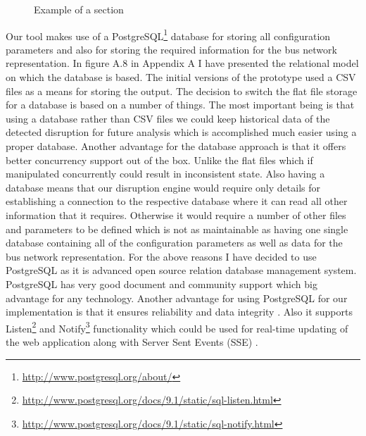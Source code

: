 \begin{figure}[ht]
	\caption{Example of a section}
	\label{fig:sectionExample}
\end{figure}

Our tool makes use of a PostgreSQL\footnote{\url{http://www.postgresql.org/about/}} database for storing all configuration parameters and also for storing the required information for the bus network representation. In figure A.8 in Appendix A I have presented the relational model on which the database is based. The initial versions of the prototype used a CSV files as a means for storing the output. The decision to switch the flat file storage for a database is based on a number of things. The most important being is that using a database rather than CSV files we could keep historical data of the detected disruption for future analysis which is accomplished much easier using a proper database. Another advantage for the database approach is that it offers better concurrency support out of the box. Unlike the flat files which if manipulated concurrently could result in inconsistent state. Also having a database means that our disruption engine would require only details for establishing a connection to the respective database where it can read all other information that it requires. Otherwise it would require a number of other files and parameters to be defined which is not as maintainable as having one single database containing all of the configuration parameters as well as data for the bus network representation. For the above reasons I have decided to use PostgreSQL as it is advanced open source relation database management system. PostgreSQL has very good document and community support which big advantage for any technology. Another advantage for using PostgreSQL for our implementation is that it ensures reliability and data integrity \cite{lerner2007open}. Also it supports Listen\footnote{\url{http://www.postgresql.org/docs/9.1/static/sql-listen.html}} and Notify\footnote{\url{http://www.postgresql.org/docs/9.1/static/sql-notify.html}} functionality which could be used for real-time updating of the web application along with Server Sent Events (SSE) \cite{serverSentEvents}.

